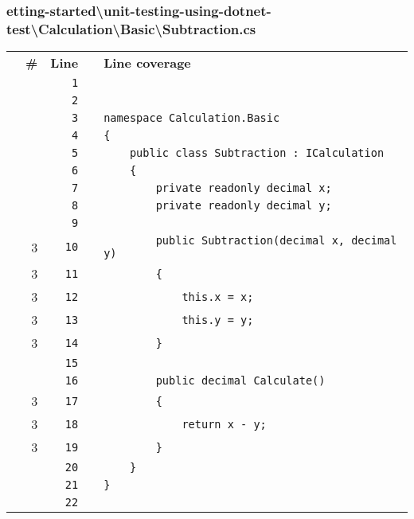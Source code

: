 \documentclass[a4paper,landscape,10pt]{article}
\begin{document}
\subsubsection{etting-started\textbackslash unit-testing-using-dotnet-test\textbackslash Calculation\textbackslash Basic\textbackslash Subtraction.cs}
\begin{longtable}[l]{lrrll}
\textbf{} & \textbf{\#} & \textbf{Line} & \textbf{} & \textbf{Line coverage}\\
\cellcolor{gray} &  & \verb~1~ & & \verb~~\\
\cellcolor{gray} &  & \verb~2~ & & \verb~~\\
\cellcolor{gray} &  & \verb~3~ & & \verb~namespace Calculation.Basic~\\
\cellcolor{gray} &  & \verb~4~ & & \verb~{~\\
\cellcolor{gray} &  & \verb~5~ & & \verb~    public class Subtraction : ICalculation~\\
\cellcolor{gray} &  & \verb~6~ & & \verb~    {~\\
\cellcolor{gray} &  & \verb~7~ & & \verb~        private readonly decimal x;~\\
\cellcolor{gray} &  & \verb~8~ & & \verb~        private readonly decimal y;~\\
\cellcolor{gray} &  & \verb~9~ & & \verb~~\\
\cellcolor{green} & 3 & \verb~10~ & & \verb~        public Subtraction(decimal x, decimal y)~\\
\cellcolor{green} & 3 & \verb~11~ & & \verb~        {~\\
\cellcolor{green} & 3 & \verb~12~ & & \verb~            this.x = x;~\\
\cellcolor{green} & 3 & \verb~13~ & & \verb~            this.y = y;~\\
\cellcolor{green} & 3 & \verb~14~ & & \verb~        }~\\
\cellcolor{gray} &  & \verb~15~ & & \verb~~\\
\cellcolor{gray} &  & \verb~16~ & & \verb~        public decimal Calculate()~\\
\cellcolor{green} & 3 & \verb~17~ & & \verb~        {~\\
\cellcolor{green} & 3 & \verb~18~ & & \verb~            return x - y;~\\
\cellcolor{green} & 3 & \verb~19~ & & \verb~        }~\\
\cellcolor{gray} &  & \verb~20~ & & \verb~    }~\\
\cellcolor{gray} &  & \verb~21~ & & \verb~}~\\
\cellcolor{gray} &  & \verb~22~ & & \verb~~\\
\end{longtable}
\end{document}
